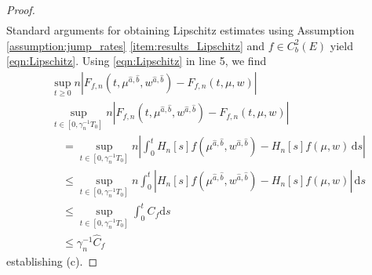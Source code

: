 \documentclass[a4paper]{article}
\newcommand{\dd}{ \mathrm{d}}
\numberwithin{equation}{section}
\theoremstyle{definition}
\begin{document}
\begin{proof}
\begin{align*}
	\end{align*}
	Standard arguments for obtaining Lipschitz estimates using Assumption \ref{assumption:jump_rates} \ref{item:results_Lipschitz} and $f \in C_b^2(E)$ yield \eqref{eqn:Lipschitz}. Using \eqref{eqn:Lipschitz} in line 5, we find
	\begin{align*}
		& \sup_{t \geq 0} n \left| F_{f,n}(t,\mu^{\hat{a},\hat{b}},w^{\hat{a},\hat{b}}) - F_{f,n}(t,\mu,w) \right| \\
		& \sup_{t \in[0,\gamma_n^{-1}T_0]} n \left| F_{f,n}(t,\mu^{\hat{a},\hat{b}},w^{\hat{a},\hat{b}}) - F_{f,n}(t,\mu,w) \right| \\
		& \quad  = \sup_{t \in[0,\gamma_n^{-1}T_0]} n \left| \int_0^t H_n[s]f(\mu^{\hat{a},\hat{b}},w^{\hat{a},\hat{b}}) -  H_n[s]f(\mu,w) \, \dd s \right| \\
		& \quad \leq \sup_{t \in[0,\gamma_n^{-1}T_0]}n  \int_0^t \left| H_n[s]f(\mu^{\hat{a},\hat{b}},w^{\hat{a},\hat{b}}) -  H_n[s]f(\mu,w) \right| \, \dd s \\
		& \quad \leq \sup_{t \in[0,\gamma_n^{-1}T_0]} \int_0^t C_{f} \dd s \\
		& \quad \leq \gamma_n^{-1} \hat{C}_{f}
	\end{align*}
	establishing (c).
\end{proof}
\end{document}
